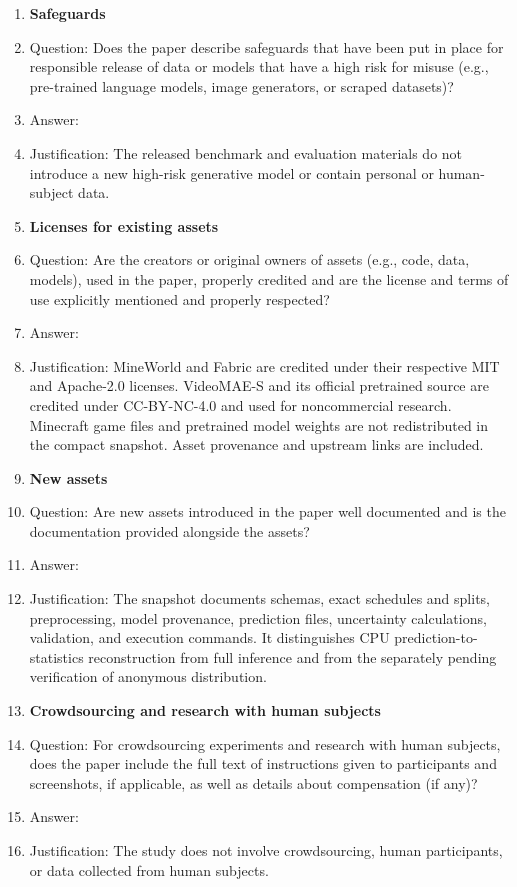 \begin{enumerate}
\item {\bf Safeguards}
    \item[] Question: Does the paper describe safeguards that have been put in place for responsible release of data or models that have a high risk for misuse (e.g., pre-trained language models, image generators, or scraped datasets)?
    \item[] Answer: \answerNA{}
    \item[] Justification: The released benchmark and evaluation materials do not introduce a new high-risk generative model or contain personal or human-subject data.


\item {\bf Licenses for existing assets}
    \item[] Question: Are the creators or original owners of assets (e.g., code, data, models), used in the paper, properly credited and are the license and terms of use explicitly mentioned and properly respected?
    \item[] Answer: \answerYes{}
    \item[] Justification: MineWorld and Fabric are credited under their respective MIT and Apache-2.0 licenses. VideoMAE-S and its official pretrained source are credited under CC-BY-NC-4.0 and used for noncommercial research. Minecraft game files and pretrained model weights are not redistributed in the compact snapshot. Asset provenance and upstream links are included.


\newpage
\item {\bf New assets}
    \item[] Question: Are new assets introduced in the paper well documented and is the documentation provided alongside the assets?
    \item[] Answer: \answerYes{}
    \item[] Justification: The snapshot documents schemas, exact schedules and splits, preprocessing, model provenance, prediction files, uncertainty calculations, validation, and execution commands. It distinguishes CPU prediction-to-statistics reconstruction from full inference and from the separately pending verification of anonymous distribution.


\item {\bf Crowdsourcing and research with human subjects}
    \item[] Question: For crowdsourcing experiments and research with human subjects, does the paper include the full text of instructions given to participants and screenshots, if applicable, as well as details about compensation (if any)? 
    \item[] Answer: \answerNA{}
    \item[] Justification: The study does not involve crowdsourcing, human participants, or data collected from human subjects.



\end{enumerate}

